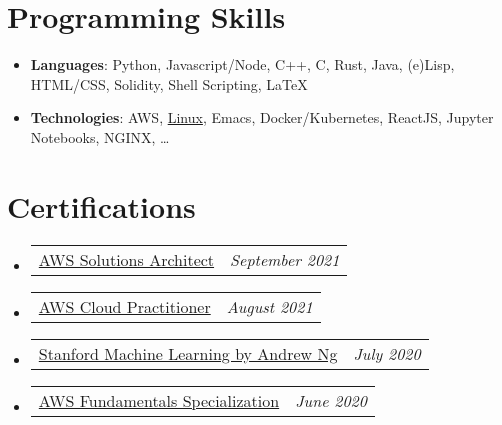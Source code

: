 \documentclass[letterpaper,11pt]{article}
\makeatletter
\newcommand{\resumeItem}[2]{
	\item[]\small{
		\textbf{#1}{: #2 \vspace{-2pt}}
	}
}
\newcommand{\certItem}[2]{
	\vspace{-1pt}\item[]
	\begin{tabular*}{0.96\textwidth}{l@{\extracolsep{\fill}}r}
		#1 & \textit{\small #2} \\
	\end{tabular*}\vspace{-5pt}
}
\newcommand{\resumeSubHeadingListStart}{\begin{itemize}[leftmargin=1mm]}
\newcommand{\resumeSubHeadingListEnd}{\end{itemize}}
\makeatother
\begin{document}
%
\section{Programming Skills}
\resumeSubHeadingListStart
\resumeItem{Languages}
{Python, Javascript/Node, C++, C, Rust, Java, (e)Lisp, HTML/CSS, Solidity, Shell Scripting, \LaTeX}
\resumeItem{Technologies}
{AWS, \href{https://raw.githubusercontent.com/sachiniyer/resume/master/environment.png}{Linux}, Emacs, Docker/Kubernetes, ReactJS, Jupyter Notebooks, NGINX, \ldots}
\resumeSubHeadingListEnd


\section{Certifications}
\resumeSubHeadingListStart
\certItem{\href{https://www.credly.com/badges/ef46fdf4-2c55-474d-a963-9ee14107160f}{AWS Solutions Architect}}
{September 2021}
\certItem{\href{https://www.credly.com/badges/c8d7f47f-c6c1-4af9-8391-5b509b92b271}{AWS Cloud Practitioner}}
{August 2021}
\certItem{\href{https://coursera.org/share/29802cca497e8680b26b241d0ef50b59}{Stanford Machine Learning by Andrew Ng}}
{July 2020}
\certItem{\href{https://coursera.org/share/daef661212dab251985d69e4fb71f730}{AWS Fundamentals Specialization}}
{June 2020}
\resumeSubHeadingListEnd

\end{document}
